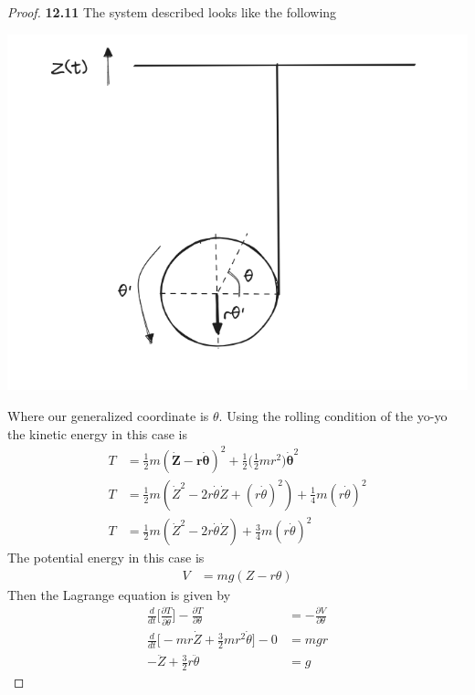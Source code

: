 \documentclass[11pt]{article}
\theoremstyle{definition}
\begin{document}
\begin{proof}{\textbf{12.11}}
    The system described looks like the following
    \begin{center}
        \includegraphics[scale=0.45]{ch12-11.png}
    \end{center}
    Where our generalized coordinate is $\theta$.
    Using the rolling condition of the yo-yo the kinetic energy in this case is
    \begin{align*}
        T &= \frac{1}{2}m(\bm{\bm{\dot{Z}} - r \dot{\theta}})^2
        + \frac{1}{2}\bigg(\frac{1}{2}mr^2\bigg)\bm{\dot{\theta}}^2\\
        T &= \frac{1}{2}m(\dot{Z}^2 - 2r\dot{\theta}\dot{Z} + (r \dot{\theta})^2)
        + \frac{1}{4}m(r\dot{\theta})^2\\
        T &= \frac{1}{2}m(\dot{Z}^2 - 2r\dot{\theta}\dot{Z})
        + \frac{3}{4}m(r\dot{\theta})^2
    \end{align*}
    The potential energy in this case is
    \begin{align*}
        V &= mg(Z - r\theta)
    \end{align*}
    Then the Lagrange equation is given by
    \begin{align*}
        \frac{d}{dt}\bigg[\frac{\partial T}{\partial \dot{\theta}}\bigg] - 
        \frac{\partial T}{\partial \theta}
        &= -\frac{\partial V}{\partial \theta}\\
        \frac{d}{dt}\bigg[
            -mr\dot{Z} + \frac{3}{2}mr^{2}\dot{\theta}
        \bigg] - 0 &= mgr\\
        -\ddot{Z} + \frac{3}{2}r\ddot{\theta} &= g

\end{align*}
\end{proof}
\end{document}
